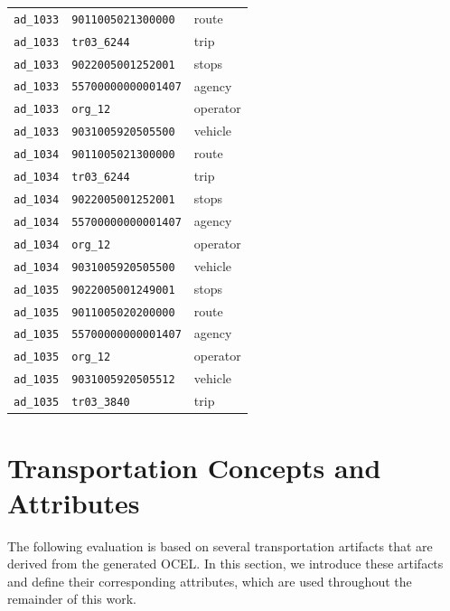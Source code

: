 \begin{table}[htbp]
\begin{minipage}[t]{.38\textwidth}
\begin{tabular}{lll}
    \texttt{ad\_1033} & \texttt{9011005021300000}  & route \\
    \texttt{ad\_1033} & \texttt{tr03\_6244}        & trip \\
    \texttt{ad\_1033} & \texttt{9022005001252001}  & stops \\
    \texttt{ad\_1033} & \texttt{55700000000001407} & agency \\
    \texttt{ad\_1033} & \texttt{org\_12}           & operator \\
    \texttt{ad\_1033} & \texttt{9031005920505500}  & vehicle \\

    \texttt{ad\_1034} & \texttt{9011005021300000}  & route \\
    \texttt{ad\_1034} & \texttt{tr03\_6244}        & trip \\
    \texttt{ad\_1034} & \texttt{9022005001252001}  & stops \\
    \texttt{ad\_1034} & \texttt{55700000000001407} & agency \\
    \texttt{ad\_1034} & \texttt{org\_12}           & operator \\
    \texttt{ad\_1034} & \texttt{9031005920505500}  & vehicle \\

    \texttt{ad\_1035} & \texttt{9022005001249001}  & stops \\
    \texttt{ad\_1035} & \texttt{9011005020200000}  & route \\
    \texttt{ad\_1035} & \texttt{55700000000001407} & agency \\
    \texttt{ad\_1035} & \texttt{org\_12}           & operator \\
    \texttt{ad\_1035} & \texttt{9031005920505512}  & vehicle \\
    \texttt{ad\_1035} & \texttt{tr03\_3840}        & trip \\
    \bottomrule
    \end{tabular}
  \end{minipage}  
\end{table}

\newpage





\section{Transportation Concepts and Attributes}
The following evaluation is based on several transportation artifacts that are derived from the generated OCEL. In this section, we introduce these artifacts and define their corresponding attributes, which are used throughout the remainder of this work.

